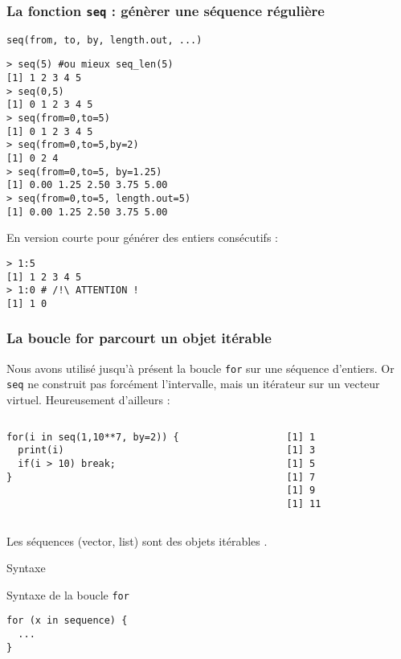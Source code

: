 \documentclass[10pt]{beamer}
\begin{document}
\begin{frame}[fragile]
  \frametitle{  La fonction \texttt{seq} : génèrer une séquence régulière}
  \begin{center}
    \alert{\texttt{seq(from, to, by, length.out, ...)}}
  \end{center}

\begin{lstlisting}
> seq(5) #ou mieux seq_len(5)
[1] 1 2 3 4 5
> seq(0,5)
[1] 0 1 2 3 4 5
> seq(from=0,to=5)
[1] 0 1 2 3 4 5
> seq(from=0,to=5,by=2)
[1] 0 2 4
> seq(from=0,to=5, by=1.25)
[1] 0.00 1.25 2.50 3.75 5.00
> seq(from=0,to=5, length.out=5)
[1] 0.00 1.25 2.50 3.75 5.00
\end{lstlisting}

En version courte pour générer des entiers consécutifs :   
\begin{lstlisting}
> 1:5
[1] 1 2 3 4 5
> 1:0 # /!\ ATTENTION ! 
[1] 1 0
\end{lstlisting}
\end{frame}



\begin{frame}[fragile]
  \frametitle{La boucle for parcourt un objet itérable}

  Nous avons utilisé jusqu'à présent la boucle \texttt{for} sur une séquence d’entiers.
  Or \texttt{seq} ne construit pas forcément l'intervalle, mais un itérateur sur un vecteur virtuel.
  Heureusement d'ailleurs :
\begin{columns}[t]
\begin{column}{0.58\textwidth}
  \begin{lstlisting}[style=editor]
for(i in seq(1,10**7, by=2)) {
  print(i)
  if(i > 10) break;
}    
  \end{lstlisting}
\end{column}
\begin{column}{0.38\textwidth}
  \begin{lstlisting}
[1] 1
[1] 3
[1] 5
[1] 7
[1] 9
[1] 11
  \end{lstlisting}
\end{column}
\end{columns}

Les séquences (vector, list) sont des objets itérables .
\begin{block}{Syntaxe}
  
\end{block}{Syntaxe de la boucle \texttt{for}}
\begin{lstlisting}[style=edblock]
for (x in sequence) {
  ...
}  
\end{lstlisting}
  
\end{frame}
\end{document}
